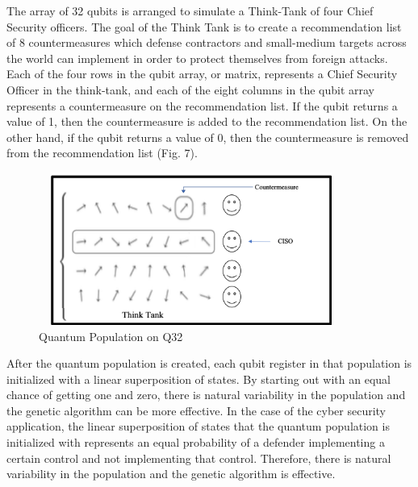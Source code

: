 The array of 32 qubits is arranged to simulate a Think-Tank of four Chief Security officers. The goal of the Think Tank is to create a recommendation list of 8 countermeasures which defense contractors and small-medium targets across the world can implement in order to protect themselves from foreign attacks. Each of the four rows in the qubit array, or matrix, represents a Chief Security Officer in the think-tank, and each of the eight columns in the qubit array represents a countermeasure on the recommendation list. If the qubit returns a value of 1, then the countermeasure is added to the recommendation list. On the other hand, if the qubit returns a value of 0, then the countermeasure is removed from the recommendation list (Fig. 7). 

\begin{figure}[ht]%
\centering
\includegraphics[width=10cm,height=5cm]{Images/quantum-population.png}
\caption{Quantum Population on Q32}%
\end{figure}


\vspace{1mm}

After the quantum population is created, each qubit register in that population is initialized with a linear superposition of states. By starting out with an equal chance of getting one and zero, there is natural variability in the population and the genetic algorithm can be more effective. In the case of the cyber security application, the linear superposition of states that the quantum population is initialized with represents an equal probability of a defender implementing a certain control and not implementing that control. Therefore, there is natural variability in the population and the genetic algorithm is effective.

\subsection*{\color{SubSectionBlue}{Phase 2 of Quantum Save}}
 \\

